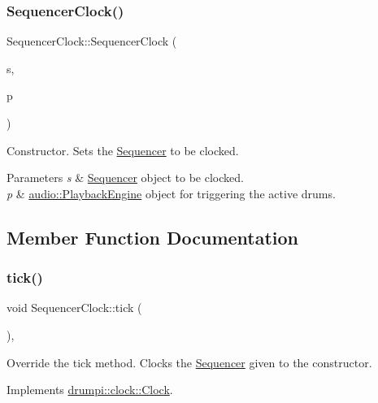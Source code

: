 \subsubsection{\texorpdfstring{Sequencer\+Clock()}{SequencerClock()}}
{\footnotesize\ttfamily Sequencer\+Clock\+::\+Sequencer\+Clock (\begin{DoxyParamCaption}\item[{std\+::shared\+\_\+ptr$<$ \hyperlink{classdrumpi_1_1Sequencer}{Sequencer} $>$}]{s,  }\item[{\hyperlink{classdrumpi_1_1audio_1_1PlaybackEngine}{audio\+::\+Playback\+Engine} \&}]{p }\end{DoxyParamCaption})}

Constructor. Sets the \hyperlink{classdrumpi_1_1Sequencer}{Sequencer} to be clocked. 
\begin{DoxyParams}{Parameters}
{\em s} & \hyperlink{classdrumpi_1_1Sequencer}{Sequencer} object to be clocked. \\
\hline
{\em p} & \hyperlink{classdrumpi_1_1audio_1_1PlaybackEngine}{audio\+::\+Playback\+Engine} object for triggering the active drums. \\
\hline
\end{DoxyParams}


\subsection{Member Function Documentation}
\mbox{\label{classdrumpi_1_1SequencerClock_ac75142ddc2ee0dcd3c52d13e44b0d85f}} 
\subsubsection{\texorpdfstring{tick()}{tick()}}
{\footnotesize\ttfamily void Sequencer\+Clock\+::tick (\begin{DoxyParamCaption}{ }\end{DoxyParamCaption})\hspace{0.3cm}{\ttfamily [override]}, {\ttfamily [virtual]}}

Override the tick method. Clocks the \hyperlink{classdrumpi_1_1Sequencer}{Sequencer} given to the constructor. 

Implements \hyperlink{classdrumpi_1_1clock_1_1Clock_ade9259c06e6b90bbd92e155a2506d3a1}{drumpi\+::clock\+::\+Clock}.



